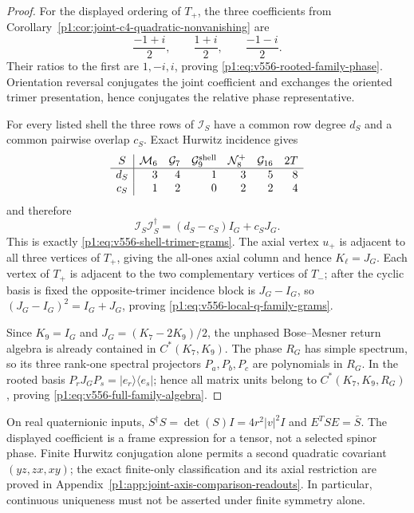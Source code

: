 \documentclass[11pt]{article}
\begin{document}
\begin{proof}
For the displayed ordering of \(T_+\), the three coefficients from
Corollary~\ref{p1:cor:joint-c4-quadratic-nonvanishing} are
\[
 \frac{-1+i}{2},\qquad \frac{1+i}{2},\qquad \frac{-1-i}{2}.
\]
Their ratios to the first are \(1,-i,i\), proving
\eqref{p1:eq:v556-rooted-family-phase}.  Orientation reversal conjugates the
joint coefficient and exchanges the oriented trimer presentation, hence
conjugates the relative phase representative.

For every listed shell the three rows of \(\mathcal I_S\) have a common row
degree \(d_S\) and a common pairwise overlap \(c_S\).  Exact Hurwitz
incidence gives
\[
\begin{array}{c|rrrrrr}
 S&\mathcal M_6&\mathcal G_7&\mathcal G_9^{\rm shell}&
 \mathcal N_8^+&\mathcal G_{16}&2T\\ \hline
 d_S&3&4&1&3&5&8\\
 c_S&1&2&0&2&2&4
\end{array}
\]
and therefore
\[
 \mathcal I_S\mathcal I_S^\dagger=(d_S-c_S)I_G+c_SJ_G.
\]
This is exactly \eqref{p1:eq:v556-shell-trimer-grams}.  The axial vertex
\(u_+\) is adjacent to all three vertices of \(T_+\), giving the all-ones
axial column and hence \(K_\ell=J_G\).  Each vertex of \(T_+\) is adjacent
to the two complementary vertices of \(T_-\); after the cyclic basis is
fixed the opposite-trimer incidence block is \(J_G-I_G\), so
\((J_G-I_G)^2=I_G+J_G\), proving
\eqref{p1:eq:v556-local-q-family-grams}.

Since \(K_9=I_G\) and
\(J_G=(K_7-2K_9)/2\), the unphased Bose--Mesner return algebra is already
contained in \(C^*(K_7,K_9)\).  The phase \(R_G\) has simple spectrum, so
its three rank-one spectral projectors \(P_a,P_b,P_c\) are polynomials in
\(R_G\).  In the rooted basis
\(P_rJ_GP_s=|e_r\rangle\langle e_s|\); hence all matrix units belong to
\(C^*(K_7,K_9,R_G)\), proving \eqref{p1:eq:v556-full-family-algebra}.
\end{proof}

On real quaternionic inputs,
\(S^\dagger S=\det(S)I=4r^2|v|^2I\) and \(E^TSE=\bar S\).
The displayed coefficient is a frame expression for a tensor, not a selected
spinor phase.  Finite Hurwitz conjugation alone permits a second quadratic
covariant \((yz,zx,xy)\); the exact finite-only classification and its
axial restriction are proved in
Appendix~\ref{p1:app:joint-axis-comparison-readouts}.  In particular,
continuous uniqueness must not be asserted under finite symmetry alone.
\end{document}
